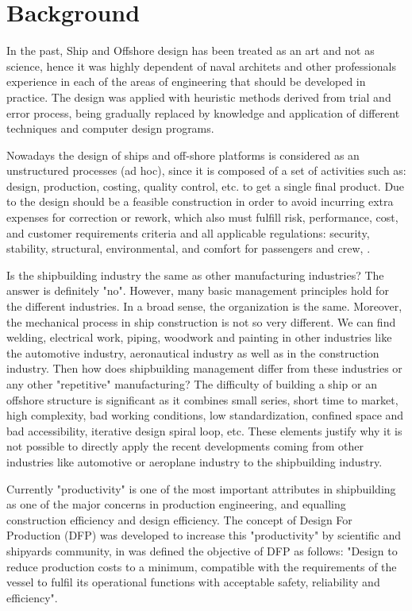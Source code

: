 \section{Background}
In the past, Ship and Offshore design has been treated as an art and not as science, hence it was highly dependent of naval architets and other  professionals experience in each of the areas of engineering that should be developed in practice. The design was applied with heuristic methods derived from trial and error process, being gradually replaced by knowledge and application of different techniques and computer design programs.


Nowadays the design of ships and off-shore platforms is considered as an unstructured processes (ad hoc), since it is composed of a set of activities such as: design, production, costing, quality control, etc. to get a single final product. Due to the design should be a feasible construction in order to avoid incurring extra expenses for correction or rework, which also must fulfill  risk, performance, cost, and customer requirements criteria and all applicable regulations: security, stability, structural, environmental, and comfort for passengers and crew, \cite{CapracePRADS10}.


Is the shipbuilding industry the same as other manufacturing industries? The answer is definitely "no". However, many basic management principles hold for the different industries. In a broad sense, the organization is the same. Moreover, the mechanical process in ship construction is not so very different. We can find welding, electrical work, piping, woodwork and painting in other industries like the automotive industry, aeronautical industry as well as in the construction industry. Then how does shipbuilding management differ from these industries or any other "repetitive" manufacturing? The difficulty of building a ship or an offshore structure is significant as it combines small series, short time to market, high complexity, bad working conditions, low standardization, confined space and bad accessibility, iterative design spiral loop, etc. These elements justify why it is not possible to directly apply the recent developments coming from other industries like automotive or aeroplane industry to the shipbuilding industry.


Currently "productivity" is one of the most important attributes in shipbuilding as one of the major concerns in production engineering, and equalling construction efficiency and design efficiency. The concept of Design For Production (DFP) was developed to increase this "productivity" by scientific and shipyards community, in \cite{USA1999} was defined the objective of DFP as follows:
"Design to reduce production costs to a minimum, compatible with the requirements of the vessel to fulfil its operational functions with acceptable safety, reliability and efficiency".


